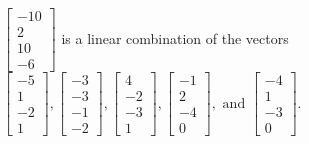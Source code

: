 \begin{exercise}
\begin{exerciseStatement}
  \end{exerciseStatement}
  \begin{exerciseAnswer}
   \(\left[\begin{array}{c}
-10 \\
2 \\
10 \\
-6
\end{array}\right]\) 
  	 is  
	a linear combination of the vectors \(\left[\begin{array}{c}
-5 \\
1 \\
-2 \\
1
\end{array}\right] , \left[\begin{array}{c}
-3 \\
-3 \\
-1 \\
-2
\end{array}\right] , \left[\begin{array}{c}
4 \\
-2 \\
-3 \\
1
\end{array}\right] , \left[\begin{array}{c}
-1 \\
2 \\
-4 \\
0
\end{array}\right] , \text{ and } \left[\begin{array}{c}
-4 \\
1 \\
-3 \\
0
\end{array}\right]\).

	
  


  \end{exerciseAnswer}
\end{exercise}